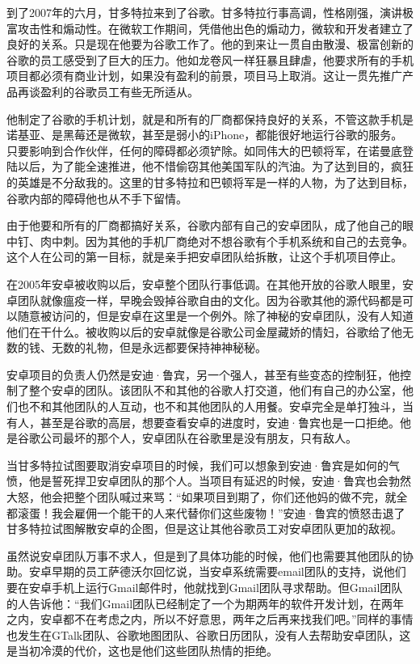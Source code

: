 \documentclass[
  letterpaper,
  DIV=11,
  numbers=noendperiod]{scrreprt}
\begin{document}
到了2007年的六月，甘多特拉来到了谷歌。甘多特拉行事高调，性格刚强，演讲极富攻击性和煽动性。在微软工作期间，凭借他出色的煽动力，微软和开发者建立了良好的关系。只是现在他要为谷歌工作了。他的到来让一贯自由散漫、极富创新的谷歌的员工感受到了巨大的压力。他如龙卷风一样狂暴且肆虐，他要求所有的手机项目都必须有商业计划，如果没有盈利的前景，项目马上取消。这让一贯先推广产品再谈盈利的谷歌员工有些无所适从。

他制定了谷歌的手机计划，就是和所有的厂商都保持良好的关系，不管这款手机是诺基亚、是黑莓还是微软，甚至是弱小的iPhone，都能很好地运行谷歌的服务。只要影响到合作伙伴，任何的障碍都必须铲除。如同伟大的巴顿将军，在诺曼底登陆以后，为了能全速推进，他不惜偷窃其他美国军队的汽油。为了达到目的，疯狂的英雄是不分敌我的。这里的甘多特拉和巴顿将军是一样的人物，为了达到目标，谷歌内部的障碍他也从不手下留情。

由于他要和所有的厂商都搞好关系，谷歌内部有自己的安卓团队，成了他自己的眼中钉、肉中刺。因为其他的手机厂商绝对不想谷歌有个手机系统和自己的去竞争。这个人在公司的第一目标，就是亲手把安卓团队给拆散，让这个手机项目停止。

在2005年安卓被收购以后，安卓整个团队行事低调。在其他开放的谷歌人眼里，安卓团队就像瘟疫一样，早晚会毁掉谷歌自由的文化。因为谷歌其他的源代码都是可以随意被访问的，但是安卓在这里是一个例外。除了神秘的安卓团队，没有人知道他们在干什么。被收购以后的安卓就像是谷歌公司金屋藏娇的情妇，谷歌给了他无数的钱、无数的礼物，但是永远都要保持神神秘秘。

安卓项目的负责人仍然是安迪·鲁宾，另一个强人，甚至有些变态的控制狂，他控制了整个安卓的团队。该团队不和其他的谷歌人打交道，他们有自己的办公室，他们也不和其他团队的人互动，也不和其他团队的人用餐。安卓完全是单打独斗，当有人，甚至是谷歌的高层，想要查看安卓的进度时，安迪·鲁宾也是一口拒绝。他是谷歌公司最坏的那个人，安卓团队在谷歌里是没有朋友，只有敌人。

当甘多特拉试图要取消安卓项目的时候，我们可以想象到安迪·鲁宾是如何的气愤，他是誓死捍卫安卓团队的那个人。当项目有延迟的时候，安迪·鲁宾也会勃然大怒，他会把整个团队喊过来骂：``如果项目到期了，你们还他妈的做不完，就全都滚蛋！我会雇佣一个能干的人来代替你们这些废物！''安迪·鲁宾的愤怒击退了甘多特拉试图解散安卓的企图，但是这让其他谷歌员工对安卓团队更加的敌视。

虽然说安卓团队万事不求人，但是到了具体功能的时候，他们也需要其他团队的协助。安卓早期的员工萨德沃尔回忆说，当安卓系统需要email团队的支持，说他们要在安卓手机上运行Gmail邮件时，他就找到Gmail团队寻求帮助。但Gmail团队的人告诉他：``我们Gmail团队已经制定了一个为期两年的软件开发计划，在两年之内，安卓都不在考虑之内，所以不好意思，两年之后再来找我们吧。''同样的事情也发生在GTalk团队、谷歌地图团队、谷歌日历团队，没有人去帮助安卓团队，这是当初冷漠的代价，这也是他们这些团队热情的拒绝。
\end{document}
